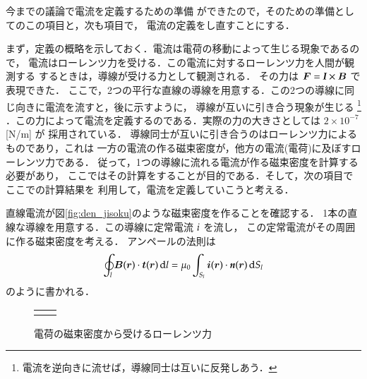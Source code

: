         今までの議論で電流を定義するための準備
        ができたので，そのための準備としてのこの項目と，次も項目で，
        電流の定義をし直すことにする．

        まず，定義の概略を示しておく．電流は電荷の移動によって生じる現象であるので，
        電流はローレンツ力を受ける．この電流に対するローレンツ力を人間が観測する
        するときは，導線が受ける力として観測される．
        その力は $\boldsymbol{F}=\textit{\textbf{I}}\times \boldsymbol{B}$ で表現できた．
        ここで，2つの平行な直線の導線を用意する．この2つの導線に同じ向きに電流を流すと，後に示すように，
        導線が互いに引き合う現象が生じる
        \footnote{
            電流を逆向きに流せば，導線同士は互いに反発しあう．
        }
        ．この力によって電流を定義するのである．実際の力の大きさとしては $2\times 10^{-7}$ [N/m] が
        採用されている．
        導線同士が互いに引き合うのはローレンツ力によるものであり，これは
        一方の電流の作る磁束密度が，他方の電流(電荷)に及ぼすローレンツ力である．
        従って，1つの導線に流れる電流が作る磁束密度を計算する必要があり，
        ここではその計算をすることが目的である．そして，次の項目でここでの計算結果を
        利用して，電流を定義していこうと考える．

        直線電流が図\ref{fig:den_jisoku}のような磁束密度を作ることを確認する．
        1本の直線な導線を用意する．この導線に定常電流 $\textit{\textit{i}}$ を流し，
        この定常電流がその周囲に作る磁束密度を考える．
        アンペールの法則は
                    \begin{align}
                        \oint_{l} \boldsymbol{B}(\boldsymbol{r})\cdot\boldsymbol{t}(\boldsymbol{r})\,\mathrm{d} l
                        =\mu_{0}\int_{S_{l}} \boldsymbol{i}(\boldsymbol{r})
                        \cdot\textit{\textbf{n}}(\boldsymbol{r})\,\mathrm{d} S_{l}
                    \end{align}
        のように書かれる．
            \begin{figure}[hbt]
                \begin{tabular}{cc}
                    \begin{minipage}{0.5\hsize}
                \begin{center}
                    {den_jisoku.pdf}
                    \caption{電流の作る磁束密度}
                    \label{fig:den_jisoku}
                \end{center}
                    \end{minipage}
                    \begin{minipage}{0.5\hsize}
                \begin{center}
                    {den_lorentz.pdf}
                    \caption{電荷の磁束密度から受けるローレンツ力}
                    \label{fig:den_lorentz}
                \end{center}
                    \end{minipage}
                \end{tabular}
            \end{figure}

